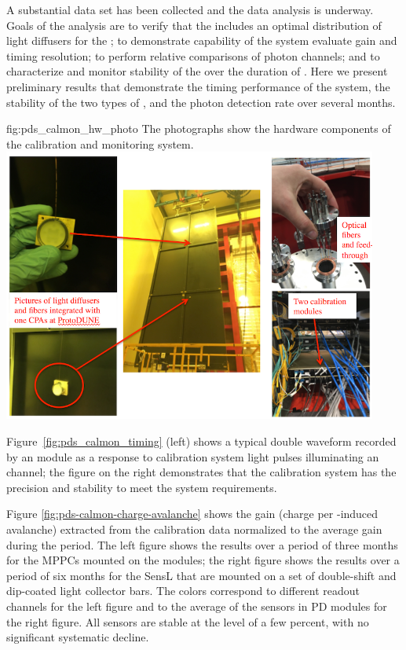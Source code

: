 A substantial  data set has been collected and the data analysis is underway. 
Goals of the analysis are to verify that the  includes an optimal distribution of light diffusers for the ;
to demonstrate capability of the system evaluate gain and timing resolution; to perform relative comparisons of photon channels;
and to characterize and monitor stability of the  over the duration of . Here we present preliminary results that demonstrate the timing performance of the system, the stability of the two types of , and the photon detection rate over several months.


\begin{dunefigure}
 {fig:pds_calmon_hw_photo}
 {The photographs show the hardware components of the  calibration and monitoring system.}
 \includegraphics[angle=0, height=9cm]{graphics/pds-calmon-fig2.png}
\end{dunefigure}


Figure~\ref{fig:pds_calmon_timing} (left) shows a typical double waveform recorded by an   module as a response to calibration system
light pulses illuminating an  channel; the figure on the right demonstrates that the calibration system has the precision and stability to meet the system requirements.

Figure \ref{fig:pds-calmon-charge-avalanche} shows the  gain (charge per \phel-induced avalanche) extracted from the calibration data normalized to the average gain during the period. The left figure shows the results over a period of three months for the MPPCs mounted on the  modules; the right figure shows the results over a period of six months for the SensL  that are mounted on a set of double-shift and dip-coated light collector bars. The colors correspond to different readout channels for the left figure and to the average of the sensors in PD modules for the right figure.
All sensors are stable at the level of a few percent, with no significant systematic decline.

